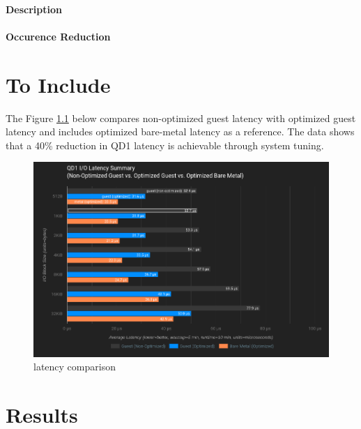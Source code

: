 \documentclass[MMR,Master,english]{twbook}
\begin{document}
\subsubsection{Description}
\subsubsection{Occurence Reduction}
\clearpage




\chapter{To Include}\label{cha:to_include}

The Figure \ref{fig:latency_comparison} below compares non-optimized guest latency with optimized guest latency and includes optimized bare-metal latency as a reference. The data shows that a 40\% reduction in QD1 latency is achievable through system tuning.



\begin{figure}[H]
	\centering
	\includegraphics[width=1.0\columnwidth]{img/latency_comparison.png}
	\caption[latency comparison]{latency comparison}
	\label{fig:latency_comparison}
\end{figure}
\clearpage




\chapter{Results}\label{cha:results}
\end{document}
